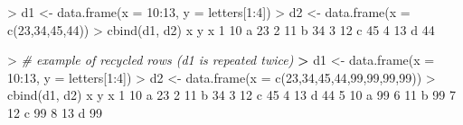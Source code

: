 \documentclass[
]{book}
\newenvironment{Shaded}{\begin{snugshade}}{\end{snugshade}}
\newcommand{\AttributeTok}[1]{\textcolor[rgb]{0.77,0.63,0.00}{#1}}
\newcommand{\CommentTok}[1]{\textcolor[rgb]{0.56,0.35,0.01}{\textit{#1}}}
\newcommand{\DecValTok}[1]{\textcolor[rgb]{0.00,0.00,0.81}{#1}}
\newcommand{\ErrorTok}[1]{\textcolor[rgb]{0.64,0.00,0.00}{\textbf{#1}}}
\newcommand{\FunctionTok}[1]{\textcolor[rgb]{0.00,0.00,0.00}{#1}}
\newcommand{\NormalTok}[1]{#1}
\newcommand{\OtherTok}[1]{\textcolor[rgb]{0.56,0.35,0.01}{#1}}
\newcommand{\SpecialCharTok}[1]{\textcolor[rgb]{0.00,0.00,0.00}{#1}}
\begin{document}
\begin{Shaded}
\begin{Highlighting}[]
\SpecialCharTok{\textgreater{}}\NormalTok{ d1 }\OtherTok{\textless{}{-}} \FunctionTok{data.frame}\NormalTok{(}\AttributeTok{x =} \DecValTok{10}\SpecialCharTok{:}\DecValTok{13}\NormalTok{, }\AttributeTok{y =}\NormalTok{ letters[}\DecValTok{1}\SpecialCharTok{:}\DecValTok{4}\NormalTok{])}
\SpecialCharTok{\textgreater{}}\NormalTok{ d2 }\OtherTok{\textless{}{-}} \FunctionTok{data.frame}\NormalTok{(}\AttributeTok{x =} \FunctionTok{c}\NormalTok{(}\DecValTok{23}\NormalTok{,}\DecValTok{34}\NormalTok{,}\DecValTok{45}\NormalTok{,}\DecValTok{44}\NormalTok{))}
\SpecialCharTok{\textgreater{}} \FunctionTok{cbind}\NormalTok{(d1, d2)}
\NormalTok{   x y  x}
\DecValTok{1} \DecValTok{10}\NormalTok{ a }\DecValTok{23}
\DecValTok{2} \DecValTok{11}\NormalTok{ b }\DecValTok{34}
\DecValTok{3} \DecValTok{12}\NormalTok{ c }\DecValTok{45}
\DecValTok{4} \DecValTok{13}\NormalTok{ d }\DecValTok{44}
\end{Highlighting}
\end{Shaded}

\begin{Shaded}
\begin{Highlighting}[]
\SpecialCharTok{\textgreater{}} \CommentTok{\# example of recycled rows (d1 is repeated twice)}
\ErrorTok{\textgreater{}}\NormalTok{ d1 }\OtherTok{\textless{}{-}} \FunctionTok{data.frame}\NormalTok{(}\AttributeTok{x =} \DecValTok{10}\SpecialCharTok{:}\DecValTok{13}\NormalTok{, }\AttributeTok{y =}\NormalTok{ letters[}\DecValTok{1}\SpecialCharTok{:}\DecValTok{4}\NormalTok{])}
\SpecialCharTok{\textgreater{}}\NormalTok{ d2 }\OtherTok{\textless{}{-}} \FunctionTok{data.frame}\NormalTok{(}\AttributeTok{x =} \FunctionTok{c}\NormalTok{(}\DecValTok{23}\NormalTok{,}\DecValTok{34}\NormalTok{,}\DecValTok{45}\NormalTok{,}\DecValTok{44}\NormalTok{,}\DecValTok{99}\NormalTok{,}\DecValTok{99}\NormalTok{,}\DecValTok{99}\NormalTok{,}\DecValTok{99}\NormalTok{))}
\SpecialCharTok{\textgreater{}} \FunctionTok{cbind}\NormalTok{(d1, d2)}
\NormalTok{   x y  x}
\DecValTok{1} \DecValTok{10}\NormalTok{ a }\DecValTok{23}
\DecValTok{2} \DecValTok{11}\NormalTok{ b }\DecValTok{34}
\DecValTok{3} \DecValTok{12}\NormalTok{ c }\DecValTok{45}
\DecValTok{4} \DecValTok{13}\NormalTok{ d }\DecValTok{44}
\DecValTok{5} \DecValTok{10}\NormalTok{ a }\DecValTok{99}
\DecValTok{6} \DecValTok{11}\NormalTok{ b }\DecValTok{99}
\DecValTok{7} \DecValTok{12}\NormalTok{ c }\DecValTok{99}
\DecValTok{8} \DecValTok{13}\NormalTok{ d }\DecValTok{99}
\end{Highlighting}
\end{Shaded}
\end{document}
